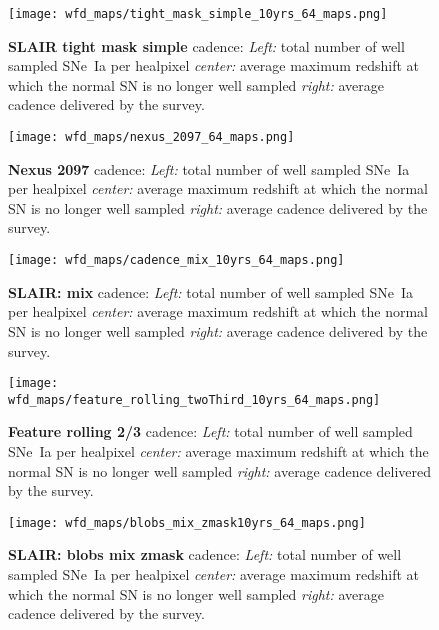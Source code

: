 \begin{figure}[h!]
  \begin{center}
    \texttt{[image: wfd\_maps/tight\_mask\_simple\_10yrs\_64\_maps.png]}
    \caption{{\bf SLAIR tight mask simple} cadence: {\em Left:} total number of well
      sampled SNe~Ia per healpixel {\em center:} average maximum
      redshift at which the normal SN is no longer well sampled {\em
        right:} average cadence delivered by the survey.}
    \label{fig:tight_mask_simple}
  \end{center}
\end{figure}

\begin{figure}[h!]
  \begin{center}
    \texttt{[image: wfd\_maps/nexus\_2097\_64\_maps.png]}
    \caption{{\bf Nexus 2097} cadence: {\em Left:} total number of well
      sampled SNe~Ia per healpixel {\em center:} average maximum
      redshift at which the normal SN is no longer well sampled {\em
        right:} average cadence delivered by the survey.}
    \label{fig:nexus_2097}
  \end{center}
\end{figure}

\begin{figure}[h!]
  \begin{center}
    \texttt{[image: wfd\_maps/cadence\_mix\_10yrs\_64\_maps.png]}
    \caption{{\bf SLAIR: mix} cadence: {\em Left:} total number of well
      sampled SNe~Ia per healpixel {\em center:} average maximum
      redshift at which the normal SN is no longer well sampled {\em
        right:} average cadence delivered by the survey.}
    \label{fig:cadence_mix}
  \end{center}
\end{figure}

\begin{figure}[h!]
  \begin{center}
    \texttt{[image: wfd\_maps/feature\_rolling\_twoThird\_10yrs\_64\_maps.png]}
    \caption{{\bf Feature rolling 2/3} cadence: {\em Left:} total number of well
      sampled SNe~Ia per healpixel {\em center:} average maximum
      redshift at which the normal SN is no longer well sampled {\em
        right:} average cadence delivered by the survey.}
    \label{fig:feature_rolling_two_third}
  \end{center}
\end{figure}

\begin{figure}[h!]
  \begin{center}
    \texttt{[image: wfd\_maps/blobs\_mix\_zmask10yrs\_64\_maps.png]}
    \caption{{\bf SLAIR: blobs mix zmask} cadence: {\em Left:} total number of well
      sampled SNe~Ia per healpixel {\em center:} average maximum
      redshift at which the normal SN is no longer well sampled {\em
        right:} average cadence delivered by the survey.}
    \label{fig:blobs_mix_zmask}
  \end{center}
\end{figure}

